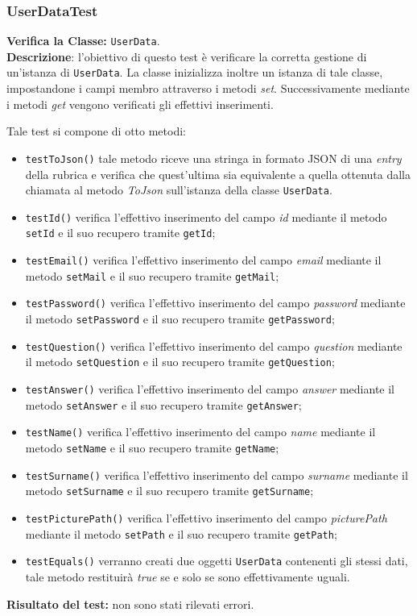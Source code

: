 \subsubsection{UserDataTest}
\textbf{Verifica la Classe:} \texttt{UserData}.\\
\textbf{Descrizione}: l'obiettivo di questo test è verificare la corretta gestione di un'istanza di \texttt{UserData}. La classe inizializza inoltre un istanza di tale classe, impostandone i campi membro attraverso i metodi \textit{set}. Successivamente mediante i metodi \textit{get} vengono verificati gli effettivi inserimenti.

Tale test si compone di otto metodi:
\begin{itemize}
\item \texttt{testToJson()} tale metodo riceve una stringa in formato JSON di una \textit{entry} della rubrica e verifica che quest'ultima sia equivalente a quella ottenuta dalla chiamata al metodo \textit{ToJson} sull'istanza della classe \texttt{UserData}.
\item \texttt{testId()} verifica l'effettivo inserimento del campo \textit{id} mediante il metodo \texttt{setId} e il suo recupero tramite \texttt{getId};
\item \texttt{testEmail()} verifica l'effettivo inserimento del campo \textit{email} mediante il metodo \texttt{setMail} e il suo recupero tramite \texttt{getMail};
\item \texttt{testPassword()} verifica l'effettivo inserimento del campo \textit{password} mediante il metodo \texttt{setPassword} e il suo recupero tramite \texttt{getPassword};
\item \texttt{testQuestion()} verifica l'effettivo inserimento del campo \textit{question} mediante il metodo \texttt{setQuestion} e il suo recupero tramite \texttt{getQuestion};
\item \texttt{testAnswer()} verifica l'effettivo inserimento del campo \textit{answer} mediante il metodo \texttt{setAnswer} e il suo recupero tramite \texttt{getAnswer};
\item \texttt{testName()} verifica l'effettivo inserimento del campo \textit{name} mediante il metodo \texttt{setName} e il suo recupero tramite \texttt{getName};
\item \texttt{testSurname()} verifica l'effettivo inserimento del campo \textit{surname} mediante il metodo \texttt{setSurname} e il suo recupero tramite \texttt{getSurname};
\item \texttt{testPicturePath()} verifica l'effettivo inserimento del campo \textit{picturePath} mediante il metodo \texttt{setPath} e il suo recupero tramite \texttt{getPath};
\item \texttt{testEquals()} verranno creati due oggetti \texttt{UserData} contenenti gli stessi dati, tale metodo restituirà \textit{true} se e solo se sono effettivamente uguali.
\end{itemize}
\textbf{Risultato del test:} non sono stati rilevati errori.


